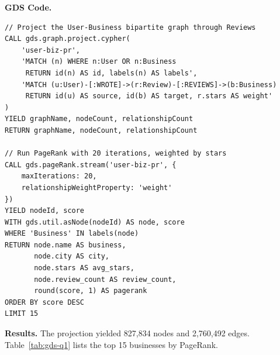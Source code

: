 \documentclass[11pt]{article}
\begin{document}
\textbf{GDS Code.}
\begin{lstlisting}[style=cypher, caption={PageRank on the User--Business review graph.}, label={lst:gds-q1}]
// Project the User-Business bipartite graph through Reviews
CALL gds.graph.project.cypher(
    'user-biz-pr',
    'MATCH (n) WHERE n:User OR n:Business
     RETURN id(n) AS id, labels(n) AS labels',
    'MATCH (u:User)-[:WROTE]->(r:Review)-[:REVIEWS]->(b:Business)
     RETURN id(u) AS source, id(b) AS target, r.stars AS weight'
)
YIELD graphName, nodeCount, relationshipCount
RETURN graphName, nodeCount, relationshipCount

// Run PageRank with 20 iterations, weighted by stars
CALL gds.pageRank.stream('user-biz-pr', {
    maxIterations: 20,
    relationshipWeightProperty: 'weight'
})
YIELD nodeId, score
WITH gds.util.asNode(nodeId) AS node, score
WHERE 'Business' IN labels(node)
RETURN node.name AS business,
       node.city AS city,
       node.stars AS avg_stars,
       node.review_count AS review_count,
       round(score, 1) AS pagerank
ORDER BY score DESC
LIMIT 15
\end{lstlisting}

\textbf{Results.} The projection yielded 827,834 nodes and 2,760,492 edges. Table~\ref{tab:gds-q1} lists the top 15 businesses by PageRank.
\end{document}
